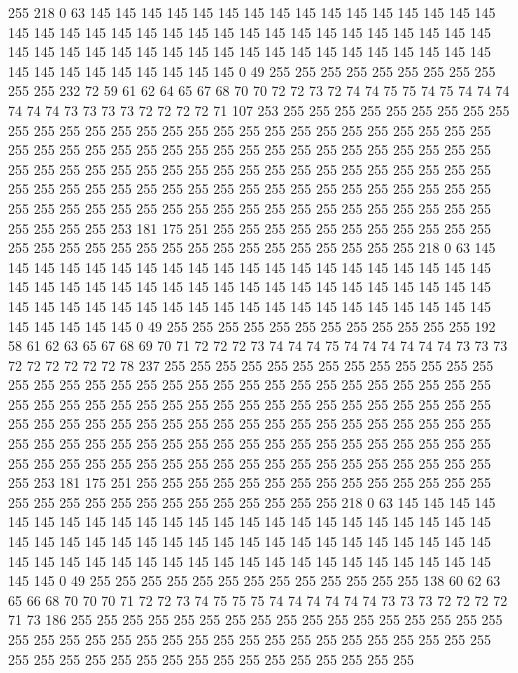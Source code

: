 255 218 0 63 145 145 145 145 145 145 145 145 145 145 145 145 145 145 145 145
145 145 145 145 145 145 145 145 145 145 145 145 145 145 145 145 145 145 145 145
145 145 145 145 145 145 145 145 145 145 145 145 145 145 145 145 145 145 145 145
145 145 145 145 145 145 145 0 49 255 255 255 255 255 255 255 255 255 255 255
232 72 59 61 62 64 65 67 68 70 70 72 72 73 72 74 74 75 75 74
75 74 74 74 74 74 74 73 73 73 73 72 72 72 72 71 107 253 255 255
255 255 255 255 255 255 255 255 255 255 255 255 255 255 255 255 255 255 255 255
255 255 255 255 255 255 255 255 255 255 255 255 255 255 255 255 255 255 255 255
255 255 255 255 255 255 255 255 255 255 255 255 255 255 255 255 255 255 255 255
255 255 255 255 255 255 255 255 255 255 255 255 255 255 255 255 255 255 255 255
255 255 255 255 255 255 255 255 255 255 255 255 255 255 255 255 255 255 255 255
255 255 255 255 255 255 253 181 175 251 255 255 255 255 255 255 255 255 255 255
255 255 255 255 255 255 255 255 255 255 255 255 255 255 255 255 255 218 0 63
145 145 145 145 145 145 145 145 145 145 145 145 145 145 145 145 145 145 145 145
145 145 145 145 145 145 145 145 145 145 145 145 145 145 145 145 145 145 145 145
145 145 145 145 145 145 145 145 145 145 145 145 145 145 145 145 145 145 145 145
145 145 145 0 49 255 255 255 255 255 255 255 255 255 255 255 255 192 58 61
62 63 65 67 68 69 70 71 72 72 72 73 74 74 74 75 74 74 74 74
74 74 73 73 73 72 72 72 72 72 72 78 237 255 255 255 255 255 255 255
255 255 255 255 255 255 255 255 255 255 255 255 255 255 255 255 255 255 255 255
255 255 255 255 255 255 255 255 255 255 255 255 255 255 255 255 255 255 255 255
255 255 255 255 255 255 255 255 255 255 255 255 255 255 255 255 255 255 255 255
255 255 255 255 255 255 255 255 255 255 255 255 255 255 255 255 255 255 255 255
255 255 255 255 255 255 255 255 255 255 255 255 255 255 255 255 255 255 255 255
255 255 253 181 175 251 255 255 255 255 255 255 255 255 255 255 255 255 255 255
255 255 255 255 255 255 255 255 255 255 255 255 255 218 0 63 145 145 145 145
145 145 145 145 145 145 145 145 145 145 145 145 145 145 145 145 145 145 145 145
145 145 145 145 145 145 145 145 145 145 145 145 145 145 145 145 145 145 145 145
145 145 145 145 145 145 145 145 145 145 145 145 145 145 145 145 145 145 145 0
49 255 255 255 255 255 255 255 255 255 255 255 255 255 138 60 62 63 65 66
68 70 70 70 71 72 72 73 74 75 75 75 74 74 74 74 74 74 73 73
73 72 72 72 72 71 73 186 255 255 255 255 255 255 255 255 255 255 255 255
255 255 255 255 255 255 255 255 255 255 255 255 255 255 255 255 255 255 255 255
255 255 255 255 255 255 255 255 255 255 255 255 255 255 255 255 255 255 255 255
